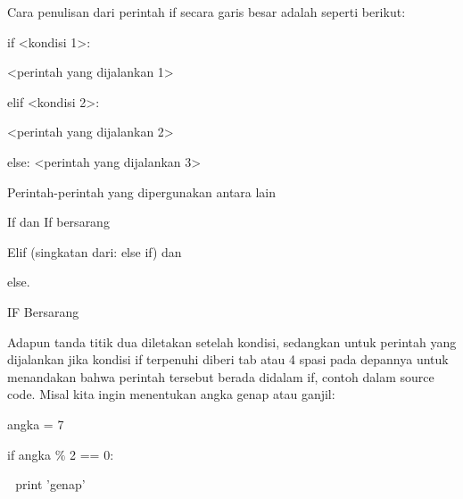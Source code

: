 Cara penulisan dari perintah if secara garis besar adalah seperti berikut: \par
\noindent 
\vspace{\baselineskip}
\vspace{\baselineskip}
if <kondisi 1>: \par
\noindent 
\vspace{\baselineskip}
 $  $<perintah yang dijalankan 1> \par
\noindent 
\vspace{\baselineskip}
elif <kondisi 2>: \par
\noindent 
\vspace{\baselineskip}
<perintah yang dijalankan 2> \par
\noindent 
\vspace{\baselineskip}
else:\vspace{\baselineskip}
 $  $<perintah yang dijalankan 3> \par
\noindent 
\vspace{\baselineskip}
\vspace{\baselineskip}
Perintah-perintah yang dipergunakan antara lain \par
\noindent 
\vspace{\baselineskip}
If dan If bersarang \par
\noindent 
\vspace{\baselineskip}
Elif (singkatan dari: else if) dan \par
\noindent 
\vspace{\baselineskip}
else.\vspace{\baselineskip}
 \par
\noindent 
\vspace{\baselineskip}
IF Bersarang \par
\noindent 
\vspace{\baselineskip}
Adapun tanda titik dua diletakan setelah kondisi, sedangkan untuk perintah yang dijalankan jika kondisi if terpenuhi diberi tab atau 4 spasi pada depannya untuk menandakan bahwa perintah tersebut berada didalam if, contoh dalam source code. Misal kita ingin menentukan angka genap atau ganjil: \par
\noindent 
\vspace{\baselineskip}
angka = 7 \par
\noindent 
\vspace{\baselineskip}
if angka  $  \%  $ 2 == 0: \par
\noindent 
\vspace{\baselineskip}
 $  $  $  $ print 'genap' \par
